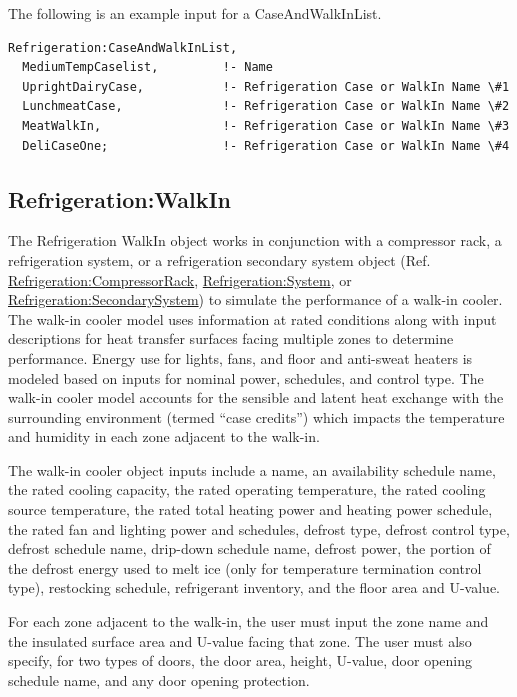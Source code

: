The following is an example input for a CaseAndWalkInList.

\begin{lstlisting}
Refrigeration:CaseAndWalkInList,
  MediumTempCaselist,         !- Name
  UprightDairyCase,           !- Refrigeration Case or WalkIn Name \#1
  LunchmeatCase,              !- Refrigeration Case or WalkIn Name \#2
  MeatWalkIn,                 !- Refrigeration Case or WalkIn Name \#3
  DeliCaseOne;                !- Refrigeration Case or WalkIn Name \#4
\end{lstlisting}

\subsection{Refrigeration:WalkIn}\label{refrigerationwalkin}

The Refrigeration WalkIn object works in conjunction with a compressor rack, a refrigeration system, or a refrigeration secondary system object (Ref. \hyperref[refrigerationcompressorrack]{Refrigeration:CompressorRack}, \hyperref[refrigerationsystem]{Refrigeration:System}, or \hyperref[refrigerationsecondarysystem]{Refrigeration:SecondarySystem}) to simulate the performance of a walk-in cooler. The walk-in cooler model uses information at rated conditions along with input descriptions for heat transfer surfaces facing multiple zones to determine performance. Energy use for lights, fans, and floor and anti-sweat heaters is modeled based on inputs for nominal power, schedules, and control type. The walk-in cooler model accounts for the sensible and latent heat exchange with the surrounding environment (termed ``case credits'') which impacts the temperature and humidity in each zone adjacent to the walk-in.

The walk-in cooler object inputs include a name, an availability schedule name, the rated cooling capacity, the rated operating temperature, the rated cooling source temperature, the rated total heating power and heating power schedule, the rated fan and lighting power and schedules, defrost type, defrost control type, defrost schedule name, drip-down schedule name, defrost power, the portion of the defrost energy used to melt ice (only for temperature termination control type), restocking schedule, refrigerant inventory, and the floor area and U-value.

For each zone adjacent to the walk-in, the user must input the zone name and the insulated surface area and U-value facing that zone. The user must also specify, for two types of doors, the door area, height, U-value, door opening schedule name, and any door opening protection.

